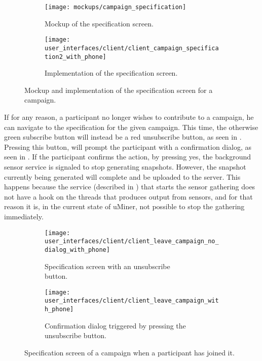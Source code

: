 \begin{figure}[!htbp]
    \begin{subfigure}[!t]{.48\textwidth}
        \centering
        \texttt{[image: mockups/campaign\_specification]}
        \caption{Mockup of the specification screen.}
        \label{fig:mockup_campaign_specification}
    \end{subfigure}%
    \begin{subfigure}[!t]{.52\textwidth}
        \centering
        \texttt{[image: user\_interfaces/client/client\_campaign\_specification2\_with\_phone]}
        \caption{Implementation of the specification screen.}
        \label{fig:implementation_campaign_specification}
    \end{subfigure}
    \caption{Mockup and implementation of the specification screen for a campaign.}
    \label{fig:campaign_specification}
\end{figure}
\FloatBarrier

If for any reason, a participant no longer wishes to contribute to a campaign, he can navigate to the specification for the given campaign. This time, the otherwise green subscribe button will instead be a red unsubscribe button, as seen in . Pressing this button, will prompt the participant with a confirmation dialog, as seen in . If the participant confirms the action, by pressing yes, the background sensor service is signaled to stop generating snapshots. However, the snapshot currently being generated will complete and be uploaded to the server. This happens because the service (described in ) that starts the sensor gathering does not have a hook on the threads that produces output from sensors, and for that reason it is, in the current state of uMiner, not possible to stop the gathering immediately.

\begin{figure}[!htbp]
    \begin{subfigure}[!t]{.50\textwidth}
        \centering
        \texttt{[image: user\_interfaces/client/client\_leave\_campaign\_no\_dialog\_with\_phone]}
        \caption{Specification screen with an unsubscribe \\\hspace{\textwidth}button.}
        \label{fig:leave_campaign_no_dialog}
    \end{subfigure}%
    \begin{subfigure}[!t]{.50\textwidth}
        \centering
        \texttt{[image: user\_interfaces/client/client\_leave\_campaign\_with\_phone]}
        \caption{Confirmation dialog triggered by pressing the unsubscribe button.}
        \label{fig:leave_campaign_dialog}
    \end{subfigure}
    \caption{Specification screen of a campaign when a participant has joined it.}
    \label{fig:leave_campaign}
\end{figure}
\FloatBarrier

